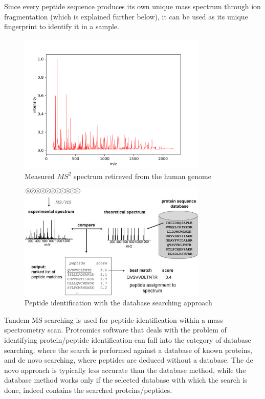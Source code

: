 \documentclass[11pt]{article}
\begin{document}
Since every peptide sequence produces its own unique mass spectrum through ion fragmentation (which is explained further below), it can be used as its unique fingerprint to identify it in a sample. 
\begin{figure}[ht]
\centering
\includegraphics[width=0.8\textwidth]{figs/peptide.png}
\caption{Measured \(MS^2\) spectrum retireved from the human genome}
\label{fig:peptide-example}
\end{figure}
\begin{figure}[ht]
\centering
\includegraphics[width=0.8\textwidth]{figs/database_search.jpg}
\caption{Peptide identification with the database searching approach \cite{Nesvizhskii2007}}
\label{fig:database-search}
\end{figure}
Tandem MS searching is used for peptide identification within a mass spectrometry scan. Proteomics software that deals with the problem of identifying protein/peptide identification can fall into the category of database searching, where the search is performed against a database of known proteins, and de novo searching, where peptides are deduced without a database. The de novo approach is typically less accurate than the database method, while the database method works only if the selected database with which the search is done, indeed contains the searched proteins/peptides.
\end{document}
